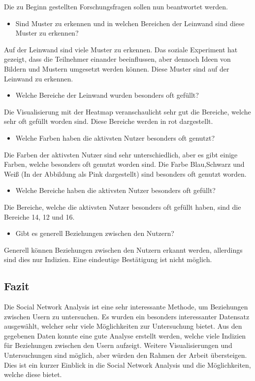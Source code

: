 \documentclass[
]{article}
\providecommand{\tightlist}{%
  \setlength{\itemsep}{0pt}\setlength{\parskip}{0pt}}
\begin{document}
Die zu Beginn gestellten Forschungsfragen sollen nun beantwortet werden.

\begin{itemize}
\tightlist
\item
  Sind Muster zu erkennen und in welchen Bereichen der Leinwand sind
  diese Muster zu erkennen?
\end{itemize}

Auf der Leinwand sind viele Muster zu erkennen. Das soziale Experiment
hat gezeigt, dass die Teilnehmer einander beeinflussen, aber dennoch
Ideen von Bildern und Mustern umgesetzt werden können. Diese Muster sind
auf der Leinwand zu erkennen.

\begin{itemize}
\tightlist
\item
  Welche Bereiche der Leinwand wurden besonders oft gefüllt?
\end{itemize}

Die Visualisierung mit der Heatmap veranschaulicht sehr gut die
Bereiche, welche sehr oft gefüllt worden sind. Diese Bereiche werden in
rot dargestellt.

\begin{itemize}
\tightlist
\item
  Welche Farben haben die aktivsten Nutzer besonders oft genutzt?
\end{itemize}

Die Farben der aktivsten Nutzer sind sehr unterschiedlich, aber es gibt
einige Farben, welche besonders oft genutzt worden sind. Die Farbe
Blau,Schwarz und Weiß (In der Abbildung als Pink dargestellt) sind
besonders oft genutzt worden.

\begin{itemize}
\tightlist
\item
  Welche Bereiche haben die aktivsten Nutzer besonders oft gefüllt?
\end{itemize}

Die Bereiche, welche die aktivsten Nutzer besonders oft gefüllt haben,
sind die Bereiche 14, 12 und 16.

\begin{itemize}
\tightlist
\item
  Gibt es generell Beziehungen zwischen den Nutzern?
\end{itemize}

Generell können Beziehungen zwischen den Nutzern erkannt werden,
allerdings sind dies nur Indizien. Eine eindeutige Bestätigung ist nicht
möglich.

\subsection{Fazit}\label{fazit}

Die Social Network Analysis ist eine sehr interessante Methode, um
Beziehungen zwischen Usern zu untersuchen. Es wurden ein besonders
interessanter Datensatz ausgewählt, welcher sehr viele Möglichkeiten zur
Untersuchung bietet. Aus den gegebenen Daten konnte eine gute Analyse
erstellt werden, welche viele Indizien für Beziehungen zwischen den
Usern aufzeigt. Weitere Visualisierungen und Untersuchungen sind
möglich, aber würden den Rahmen der Arbeit übersteigen. Dies ist ein
kurzer Einblick in die Social Network Analysis und die Möglichkeiten,
welche diese bietet.
\end{document}
